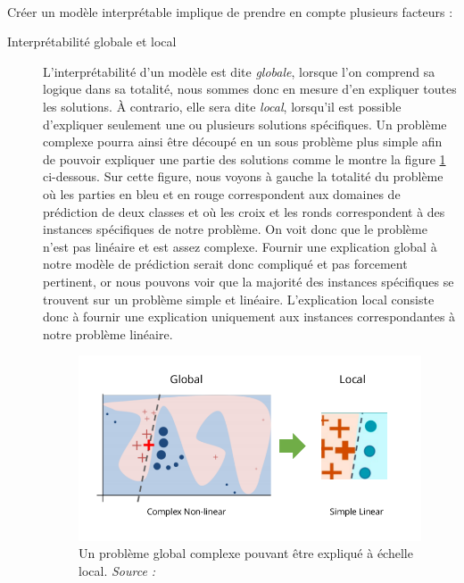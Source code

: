 \paragraph{}Créer un modèle interprétable implique de prendre en compte plusieurs facteurs :\par
\begin{description}
\item[Interprétabilité globale et local] L'interprétabilité d'un modèle est dite \textit{globale}, lorsque l'on comprend sa logique dans sa totalité, nous sommes donc en mesure d'en expliquer toutes les solutions. À contrario, elle sera dite \textit{local}, lorsqu'il est possible d'expliquer seulement une ou plusieurs solutions spécifiques. Un problème complexe pourra ainsi être découpé en un sous problème plus simple afin de pouvoir expliquer une partie des solutions comme le montre la figure \ref{globalVSlocal} ci-dessous. Sur cette figure, nous voyons à gauche la totalité du problème où les parties en bleu et en rouge correspondent aux domaines de prédiction de deux classes et où les croix et les ronds correspondent à des instances spécifiques de notre problème. On voit donc que le problème n'est pas linéaire et est assez complexe. Fournir une explication global à notre modèle de prédiction serait donc compliqué et pas forcement pertinent, or nous pouvons voir que la majorité des instances spécifiques se trouvent sur un problème simple et linéaire. L'explication local consiste donc à fournir une explication uniquement aux instances correspondantes à notre problème linéaire.
\begin{figure}[h]
\centering
\includegraphics[scale=0.4]{src_img/globalVSlocal.png}
\caption{Un problème global complexe pouvant être expliqué à échelle local. \textit{Source : \cite{limePaper}}}
\label{globalVSlocal}
\end{figure}


\end{description}
